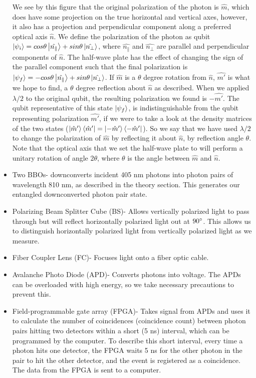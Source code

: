 \documentclass{article}
\begin{document}
\begin{itemize}
        We see by this figure that the original polarization of the photon is $\hat{m}$, which does have some projection on the true horizontal and vertical axes, however, it also has a projection and perpendicular component along a preferred optical axis $\hat{n}$. We define the polarization of the photon as qubit $\left\vert{\psi_i}\right\rangle = cos\theta \left\vert{\hat{n_\parallel}}\right\rangle + sin\theta \left\vert{\hat{n_\bot}}\right\rangle$, where $\hat{n_\parallel}$ and $\hat{n_\bot}$ are parallel and perpendicular components of $\hat{n}$. The half-wave plate has the effect of changing the sign of the parallel component such that the final polarization is $\left\vert{\psi_f}\right\rangle = -cos\theta \left\vert{\hat{n_\parallel}}\right\rangle + sin\theta \left\vert{\hat{n_\bot}}\right\rangle$. If $\hat{m}$ is a $\theta$ degree rotation from $\hat{n}$, $\hat{m'}$ is what we hope to find, a $\theta$ degree reflection about $\hat{n}$ as described. When we applied $\lambda/2$ to the original qubit, the resulting polarization we found is $-\hat{m'}$. The qubit representative of this state $\left\vert{\psi_f}\right\rangle$, is indistinguishable from the qubit representing polarization $\hat{m'}$, if we were to take a look at the density matrices of the two states ($\left\vert{\hat{m}'}\right\rangle\left\langle{\hat{m}'}\right\vert=\left\vert{-\hat{m}'}\right\rangle\left\langle{-\hat{m}'}\right\vert$). So we say that we have used $\lambda/2$ to change the polarization of $\hat{m}$ by reflecting it about $\hat{n}$, by reflection angle $\theta$. Note that the optical axis that we set the half-wave plate to will perform a unitary rotation of angle $2\theta$, where $\theta$ is the angle between $\hat{m}$ and $\hat{n}$. \cite{qie} 
        \item Two BBOs- downconverts incident 405 nm photons into photon pairs of wavelength 810 nm, as described in the theory section. This generates our entangled downconverted photon pair state.
        \item Polarizing Beam Splitter Cube (BS)- Allows vertically polarized light to pass through but will reflect horizontally polarized light out at $90\degree$. This allows us to distinguish horizontally polarized light from vertically polarized light as we measure. 
        \item Fiber Coupler Lens (FC)- Focuses light onto a fiber optic cable.
        \item Avalanche Photo Diode (APD)- Converts photons into voltage. The APDs can be overloaded with high energy, so we take necessary precautions to prevent this.
        \item Field-programmable gate array (FPGA)- Takes signal from APDs and uses it to calculate the number of coincidences (coincidence count) between photon pairs hitting two detectors within a short (5 ns) interval, which can be programmed by the computer. To describe this short interval, every time a photon hits one detector, the FPGA waits 5 ns for the other photon in the pair to hit the other detector, and the event is registered as a coincidence. The data from the FPGA is sent to a computer.

\end{itemize}
\end{document}
